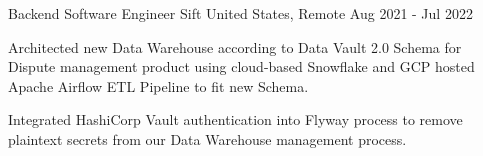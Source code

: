   \cventry
    {Backend Software Engineer} %
    {Sift} %
    {United States, Remote} %
    {Aug 2021 - Jul 2022} %
    {
      \begin{cvitems} %
        \item {Architected new Data Warehouse according to Data Vault 2.0 Schema for Dispute management product using cloud-based Snowflake and GCP hosted Apache Airflow ETL Pipeline to fit new Schema.}
        \item {Integrated HashiCorp Vault authentication into Flyway process to remove plaintext secrets from our Data Warehouse management process.}
      \end{cvitems}
    }

